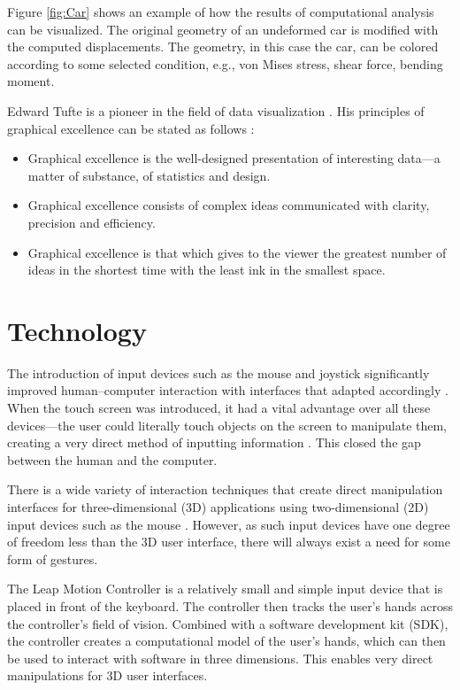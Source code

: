Figure \ref{fig:Car} shows an example of how the results of computational analysis can be visualized. The original geometry of an undeformed car is modified with the computed displacements. The geometry, in this case the car, can be colored according to some selected condition, e.g., von Mises stress, shear force, bending moment. 

Edward Tufte is a pioneer in the field of data visualization \cite{tufte1997visual, tufte1990envisioning, tufte2001the}. His principles of graphical excellence can be stated as follows \cite{tufte2001the}:

\begin{itemize} 
\item Graphical excellence is the well-designed presentation of interesting data--–a matter of substance, of statistics and design.
\item Graphical excellence consists of complex ideas communicated with clarity, precision and efficiency.
\item Graphical excellence is that which gives to the viewer the greatest number of ideas in the shortest time with the least ink in the smallest space.
\end{itemize} 

\section{Technology}
The introduction of input devices such as the mouse and joystick significantly improved human--computer interaction with interfaces that adapted accordingly \cite{Sears1990}. When the touch screen was introduced, it had a vital advantage over all these devices---the user could literally touch objects on the screen to manipulate them, creating a very direct method of inputting information \cite{Sears1990}. This closed the gap between the human and the computer.

There is a wide variety of interaction techniques that create direct manipulation interfaces for three-dimensional (3D) applications using two-dimensional (2D) input devices such as the mouse \cite{Nielson:1987:DMT:319120.319134}. However, as such input devices have one degree of freedom less than the 3D user interface, there will always exist a need for some form of gestures. 

The Leap Motion Controller \cite{LeapMotion2013} is a relatively small and simple input device that is placed in front of the keyboard. The controller then tracks the user’s hands across the controller’s field of vision. Combined with a software development kit (SDK), the controller creates a computational model of the user’s hands, which can then be used to interact with software in three dimensions. This enables very direct manipulations for 3D user interfaces.

